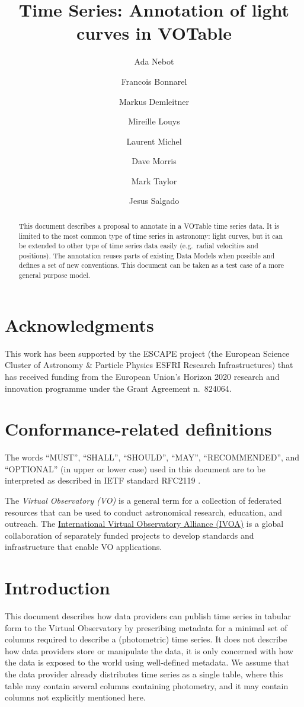 \documentclass[11pt,a4paper]{ivoa} 
\title{Time Series: Annotation of light curves in VOTable}
\author[http://www.ivoa.net/twiki/bin/view/IVOA/AdaNebot]{Ada Nebot}
\author[http://www.ivoa.net/twiki/bin/view/IVOA/FrancoisBonnarel]{Francois
  Bonnarel}
\author[http://www.ivoa.net/twiki/bin/view/IVOA/MarkusDemleitner]{Markus
  Demleitner}
\author[http://www.ivoa.net/twiki/bin/view/IVOA/MireilleLouys]{Mireille
  Louys}
\author[http://www.ivoa.net/twiki/bin/view/IVOA/LaurentMichel]{Laurent
  Michel}
\author[http://www.ivoa.net/twiki/bin/view/IVOA/DaveMorris]{Dave
  Morris}
\author[http://www.ivoa.net/twiki/bin/view/IVOA/MarkTaylor]{Mark Taylor}
\author[http://www.ivoa.net/twiki/bin/view/IVOA/JesusSalgado]{Jesus
  Salgado}
\begin{document}
\begin{abstract}
  This document describes a proposal to annotate in a VOTable time
  series data. It is limited to the most common type of time series in
  astronomy: light curves, but it can be extended to other type of
  time series data easily (e.g.\ radial velocities and positions). The
  annotation reuses parts of existing Data Models when possible and
  defines a set of new conventions. This document can be taken as a test
  case of a more general purpose model.
\end{abstract}

\section*{Acknowledgments}
This work has been supported by the ESCAPE project (the European
Science Cluster of Astronomy \& Particle Physics ESFRI Research
Infrastructures) that has received funding from the European Union's
Horizon 2020 research and innovation programme under the Grant
Agreement n.\ 824064.

\section*{Conformance-related definitions}

The words ``MUST'', ``SHALL'', ``SHOULD'', ``MAY'', ``RECOMMENDED'',
and ``OPTIONAL'' (in upper or lower case) used in this document are to
be interpreted as described in IETF standard RFC2119
\citep{std:RFC2119}.

The \emph{Virtual Observatory (VO)} is a general term for a collection
of federated resources that can be used to conduct astronomical
research, education, and outreach.  The
\href{http://www.ivoa.net}{International Virtual Observatory Alliance
  (IVOA)} is a global collaboration of separately funded projects to
develop standards and infrastructure that enable VO applications.


\section{Introduction}
This document describes how data providers can publish time series in
tabular form to the Virtual Observatory by prescribing metadata for a
minimal set of columns required to describe a (photometric) time
series.  It does not describe how data providers store or manipulate
the data, it is only concerned with how the data is exposed to the
world using well-defined metadata. We assume that the data provider
already distributes time series as a single table, where this table
may contain several columns containing photometry, and it may contain
columns not explicitly mentioned here.
\end{document}
